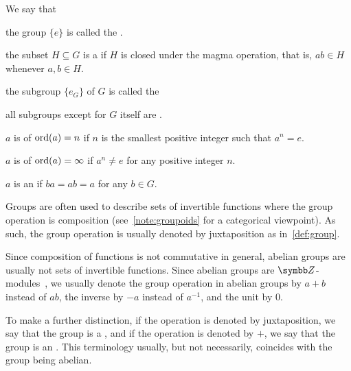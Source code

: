 \begin{definition}
  We say that
  \begin{defenum}
    \item\label{def:group/trivial_group} the group \( \{ e \} \) is called the .
    \item\label{def:group/subgroup} the subset \( H \subseteq G \) is a  if \( H \) is closed under the magma operation, that is, \( ab \in H \) whenever \( a, b \in H \).
    \item\label{def:group/trivial_subgroup} the subgroup \( \{ e_G \} \) of \( G \) is called the 
    \item\label{def:group/proper_subgroup} all subgroups except for \( G \) itself are .
    \item\label{def:group/finite_order} \( a \) is of  \( \operatorname{ord}(a) = n \) if \( n \) is the smallest positive integer such that \( a^n = e \).
    \item\label{def:group/infinite_order} \( a \) is of  \( \operatorname{ord}(a) = \infty \) if \( a^n \neq e \) for any positive integer \( n \).
    \item\label{def:group/absorbing_element} \( a \) is an  if \( ba = ab = a \) for any \( b \in G \).
  \end{defenum}
\end{definition}

\begin{note}\label{note:additive_group}
  Groups are often used to describe sets of invertible functions where the group operation is composition (see~\cref{note:groupoids} for a categorical viewpoint). As such, the group operation is usually denoted by juxtaposition as in~\cref{def:group}.

  Since composition of functions is not commutative in general, abelian groups are usually not sets of invertible functions. Since abelian groups are \( \BB{Z} \)-modules~, we usually denote the group operation in abelian groups by \( a + b \) instead of \( ab \), the inverse by \( -a \) instead of \( a^{-1} \), and the unit by \( 0 \).

  To make a further distinction, if the operation is denoted by juxtaposition, we say that the group is a , and if the operation is denoted by \( + \), we say that the group is an . This terminology usually, but not necessarily, coincides with the group being abelian.
\end{note}

